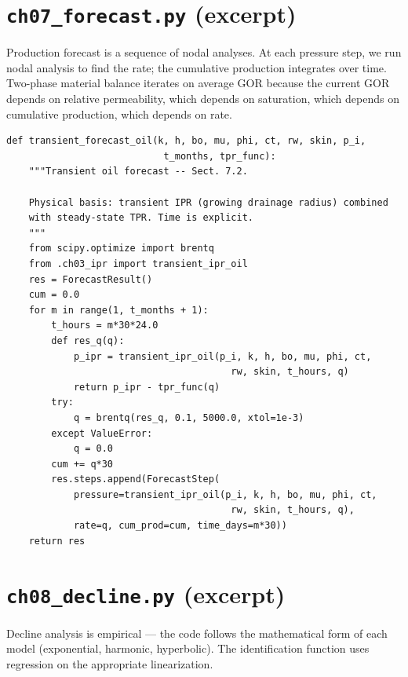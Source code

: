 \documentclass[11pt,a4paper,openany]{book}
\newcommand{\code}[1]{\texttt{#1}}
\begin{document}
\section{\code{ch07\_forecast.py} (excerpt)}

\begin{theory}
Production forecast is a sequence of nodal analyses. At each pressure
step, we run nodal analysis to find the rate; the cumulative
production integrates over time. Two-phase material balance iterates
on average GOR because the current GOR depends on relative
permeability, which depends on saturation, which depends on
cumulative production, which depends on rate.
\end{theory}

\begin{lstlisting}
def transient_forecast_oil(k, h, bo, mu, phi, ct, rw, skin, p_i,
                            t_months, tpr_func):
    """Transient oil forecast -- Sect. 7.2.

    Physical basis: transient IPR (growing drainage radius) combined
    with steady-state TPR. Time is explicit.
    """
    from scipy.optimize import brentq
    from .ch03_ipr import transient_ipr_oil
    res = ForecastResult()
    cum = 0.0
    for m in range(1, t_months + 1):
        t_hours = m*30*24.0
        def res_q(q):
            p_ipr = transient_ipr_oil(p_i, k, h, bo, mu, phi, ct,
                                        rw, skin, t_hours, q)
            return p_ipr - tpr_func(q)
        try:
            q = brentq(res_q, 0.1, 5000.0, xtol=1e-3)
        except ValueError:
            q = 0.0
        cum += q*30
        res.steps.append(ForecastStep(
            pressure=transient_ipr_oil(p_i, k, h, bo, mu, phi, ct,
                                        rw, skin, t_hours, q),
            rate=q, cum_prod=cum, time_days=m*30))
    return res
\end{lstlisting}

\section{\code{ch08\_decline.py} (excerpt)}

\begin{theory}
Decline analysis is empirical — the code follows the mathematical
form of each model (exponential, harmonic, hyperbolic). The
identification function uses regression on the appropriate
linearization.
\end{theory}
\end{document}

